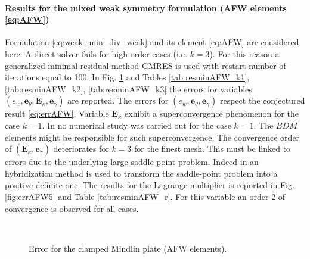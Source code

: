 \paragraph{Results for the mixed weak symmetry formulation (AFW elements \eqref{eq:AFW})} 
Formulation \eqref{eq:weak_min_div_weak} and its element \eqref{eq:AFW} are considered here. A direct solver fails for high order cases (i.e. $k=3$). For this reason a generalized minimal residual method GMRES \cite{saad1986gmres} is used with restart number of iterations equal to 100. In Fig. \ref{fig:errorAFW} and Tables \ref{tab:resminAFW_k1}, \ref{tab:resminAFW_k2}, \ref{tab:resminAFW_k3} the errors for variables $(e_w, \bm{e}_\theta, \bm{E}_\kappa, \bm{e}_\gamma)$  are reported. The errors for $(e_w, \bm{e}_\theta, \bm{e}_\gamma)$ respect the conjectured result \eqref{eq:errAFW}. Variable $\bm{E}_\kappa$ exhibit a superconvergence phenomenon for the case $k=1$. In \cite{arnold2014elastodynamics} no numerical study was carried out for the case $k=1$. The $BDM$ elements might be responsible for such superconvergence. The convergence order of $(\bm{E}_\kappa, \bm{e}_\gamma)$ deteriorates for $k=3$ for the finest mesh. This must be linked to errors due to the underlying large saddle-point problem. Indeed in \cite{arnold2014elastodynamics} an hybridization method is used to transform the saddle-point problem into a positive definite one. The results for the Lagrange multiplier is reported in Fig. \ref{fig:errAFW5} and Table \ref{tab:resminAFW_r}. For this variable an order 2 of convergence is observed for all cases.

\begin{figure}[htbp]%
	\centering
	\hspace{8pt}%
	 \\
	\hspace{8pt}%
	\caption{Error for the clamped Mindlin plate (AFW elements).}%
	\label{fig:errorAFW}%
\end{figure}





